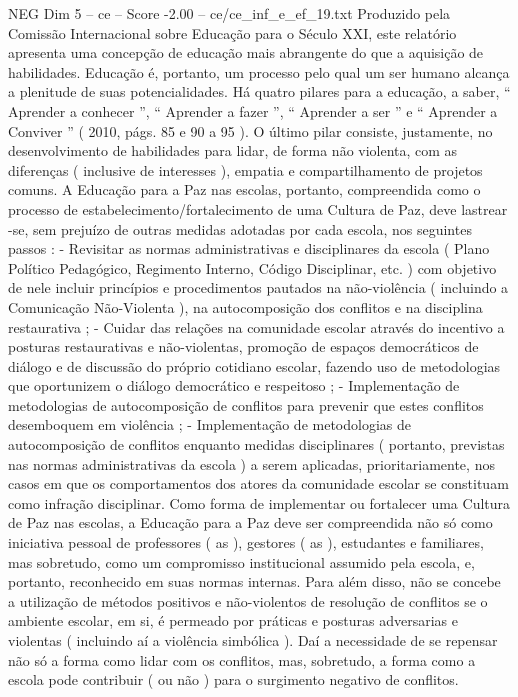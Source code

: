 \begin{textsample}{NEG Dim 5 – ce – Score -2.00 – ce/ce\_inf\_e\_ef\_19.txt}
Produzido pela Comissão Internacional sobre Educação para o Século XXI, este relatório apresenta uma concepção de educação mais abrangente do que a aquisição de habilidades.
Educação é, portanto, um processo pelo qual um ser humano alcança a plenitude de suas potencialidades.
Há quatro pilares para a educação, a saber, “ Aprender a conhecer ”, “ Aprender a fazer ”, “ Aprender a ser ” e “ Aprender a Conviver ” ( 2010, págs. 85 e 90 a 95 ).
O último pilar consiste, justamente, no desenvolvimento de habilidades para lidar, de forma não violenta, com as diferenças ( inclusive de interesses ), empatia e compartilhamento de projetos comuns.
A Educação para a Paz nas escolas, portanto, compreendida como o processo de estabelecimento/fortalecimento de uma Cultura de Paz, deve lastrear -se, sem prejuízo de outras medidas adotadas por cada escola, nos seguintes passos : - Revisitar as normas administrativas e disciplinares da escola ( Plano Político Pedagógico, Regimento Interno, Código Disciplinar, etc. ) com objetivo de nele incluir princípios e procedimentos pautados na não-violência ( incluindo a Comunicação Não-Violenta ), na autocomposição dos conflitos e na disciplina restaurativa ; - Cuidar das relações na comunidade escolar através do incentivo a posturas restaurativas e não-violentas, promoção de espaços democráticos de diálogo e de discussão do próprio cotidiano escolar, fazendo uso de metodologias que oportunizem o diálogo democrático e respeitoso ; - Implementação de metodologias de autocomposição de conflitos para prevenir que estes conflitos desemboquem em violência ; - Implementação de metodologias de autocomposição de conflitos enquanto medidas disciplinares ( portanto, previstas nas normas administrativas da escola ) a serem aplicadas, prioritariamente, nos casos em que os comportamentos dos atores da comunidade escolar se constituam como infração disciplinar.
Como forma de implementar ou fortalecer uma Cultura de Paz nas escolas, a Educação para a Paz deve ser compreendida não só como iniciativa pessoal de professores ( as ), gestores ( as ), estudantes e familiares, mas sobretudo, como um compromisso institucional assumido pela escola, e, portanto, reconhecido em suas normas internas.
Para além disso, não se concebe a utilização de métodos positivos e não-violentos de resolução de conflitos se o ambiente escolar, em si, é permeado por práticas e posturas adversarias e violentas ( incluindo aí a violência simbólica ).
Daí a necessidade de se repensar não só a forma como lidar com os conflitos, mas, sobretudo, a forma como a escola pode contribuir ( ou não ) para o surgimento negativo de conflitos.

\end{textsample}
